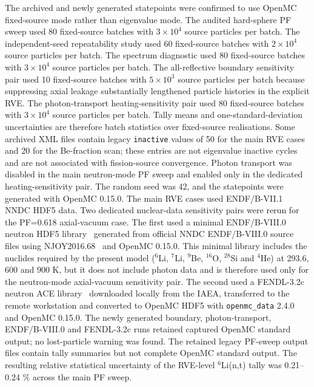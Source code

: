 \documentclass[preprint,12pt]{elsarticle}
\begin{document}
The archived and newly generated statepoints were confirmed to use OpenMC
fixed-source mode rather than eigenvalue mode.  The audited hard-sphere PF
sweep used 80 fixed-source batches with $3\times10^4$ source particles per
batch.  The independent-seed repeatability study used 60 fixed-source batches
with $2\times10^4$ source particles per batch.  The spectrum diagnostic used 80
fixed-source batches with $3\times10^4$ source particles per batch.  The
all-reflective boundary sensitivity pair used 10 fixed-source batches with
$5\times10^3$ source particles per batch because suppressing axial leakage
substantially lengthened particle histories in the explicit RVE.  The
photon-transport heating-sensitivity pair used 80 fixed-source batches with
$3\times10^4$ source particles per batch.  Tally means and
one-standard-deviation uncertainties are therefore batch statistics over
fixed-source realisations.
Some archived XML files contain legacy \texttt{inactive} values of 50 for the
main RVE cases and 20 for the Be-fraction scan; these entries are not
eigenvalue inactive cycles and are not associated with fission-source
convergence.  Photon transport was disabled in the main neutron-mode PF sweep
and enabled only in the dedicated heating-sensitivity pair.  The random seed was
42, and the statepoints were generated with OpenMC 0.15.0.  The main RVE cases
used ENDF/B-VII.1 NNDC HDF5 data.  Two dedicated nuclear-data sensitivity
pairs were rerun for the PF=0.618 axial-vacuum case.  The first used a minimal
ENDF/B-VIII.0 neutron HDF5 library~\cite{brown2018endfb8} generated from
official NNDC ENDF/B-VIII.0 source files using NJOY2016.68~\cite{njoy2016}
and OpenMC 0.15.0.  This minimal library
includes the nuclides required by the present model ($^6$Li, $^7$Li,
$^9$Be, $^{16}$O, $^{28}$Si and $^4$He) at 293.6, 600 and 900 K, but it does
not include photon data and is therefore used only for the neutron-mode
axial-vacuum sensitivity pair.  The second used a FENDL-3.2c neutron ACE
library~\cite{iaeaFendl32c,schnabel2024fendl} downloaded locally from the IAEA, transferred to
the remote workstation and converted to OpenMC HDF5 with
\texttt{openmc\_data} 2.4.0~\cite{openmcData} and OpenMC 0.15.0.  The newly
generated boundary, photon-transport, ENDF/B-VIII.0 and
FENDL-3.2c runs retained captured OpenMC standard output; no lost-particle
warning was found.  The retained legacy PF-sweep output files contain tally
summaries but not complete OpenMC standard output.  The
resulting relative statistical uncertainty of the RVE-level $^6$Li(n,t) tally
was 0.21--0.24 \% across the main PF sweep.
\end{document}
